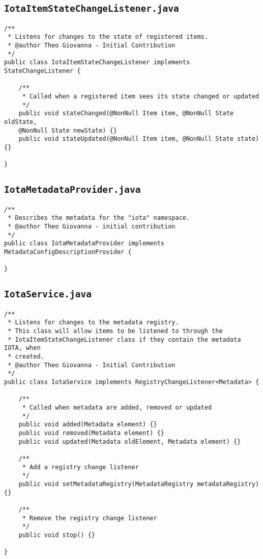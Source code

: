 \documentclass[a4paper,10pt]{article}
\begin{document}
\subsection{\texttt{IotaItemStateChangeListener.java}}

\begin{verbatim}
/**
 * Listens for changes to the state of registered items.
 * @author Theo Giovanna - Initial Contribution
 */
public class IotaItemStateChangeListener implements StateChangeListener {

	/**
	 * Called when a registered item sees its state changed or updated
	 */ 
	public void stateChanged(@NonNull Item item, @NonNull State oldState, 
	@NonNull State newState) {}
	public void stateUpdated(@NonNull Item item, @NonNull State state) {}

}
\end{verbatim}

\newpage

\subsection{\texttt{IotaMetadataProvider.java}}

\begin{verbatim}
/**
 * Describes the metadata for the "iota" namespace.
 * @author Theo Giovanna - initial contribution
 */
public class IotaMetadataProvider implements MetadataConfigDescriptionProvider {

}

\end{verbatim}

\subsection{\texttt{IotaService.java}}

\begin{verbatim}
/**
 * Listens for changes to the metadata registry.
 * This class will allow items to be listened to through the
 * IotaItemStateChangeListener class if they contain the metadata IOTA, when
 * created.
 * @author Theo Giovanna - Initial Contribution
 */
public class IotaService implements RegistryChangeListener<Metadata> {
	
	/**
	 * Called when metadata are added, removed or updated
	 */ 
	public void added(Metadata element) {}
	public void removed(Metadata element) {}
	public void updated(Metadata oldElement, Metadata element) {}
	
	/**
	 * Add a registry change listener
	 */
	public void setMetadataRegistry(MetadataRegistry metadataRegistry) {}
	
	/**
	 * Remove the registry change listener
	 */
	public void stop() {}
	
}

\end{verbatim}
\end{document}
